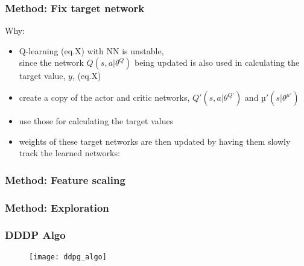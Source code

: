 \begin{frame}
\frametitle{Method: Fix target network}
Why:
\begin{itemize}
\item Q-learning (eq.X) with NN is unstable, \\
since the network $Q(s, a|\theta^Q)$ being updated is also used in
calculating the target value, $y$, (eq.X)
\end{itemize}


\begin{itemize}
\item create a copy of the actor and critic networks, $Q'(s, a|\theta^{Q'})$ and $µ'(s|\theta^{\mu'})$
\item use those for calculating the target values
\item weights of these target networks are then updated by having them slowly track the learned networks:
\end{itemize}

\end{frame}


\begin{frame}
\frametitle{Method: Feature scaling}

\end{frame}

\begin{frame}
\frametitle{Method: Exploration}
\end{frame}

\begin{frame}
\frametitle{DDDP Algo}
\begin{figure}
    \centering
    \texttt{[image: ddpg\_algo]}
\end{figure}
\end{frame}
